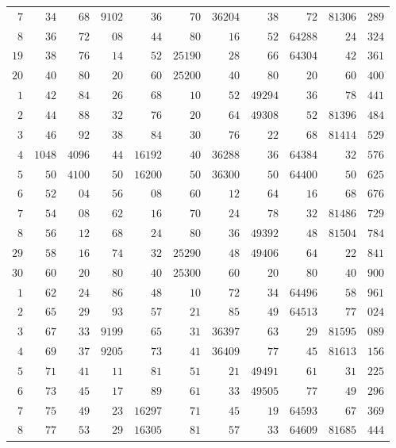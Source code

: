 \begin{longtable}{@{}r|r|r|r|r|r|r|r|r|r|r@{}}
$7$ & $34$ & $68$ & $9102$ & $36$ & $70$ & $36204$ & $38$ & $72$ & $81306$ & $289$\\
$8$ & $36$ & $72$ & $08$ & $44$ & $80$ & $16$ & $52$ & $64288$ & $24$ & $324$\\
$19$ & $38$ & $76$ & $14$ & $52$ & $25190$ & $28$ & $66$ & $64304$ & $42$ & $361$\\
$20$ & $40$ & $80$ & $20$ & $60$ & $25200$ & $40$ & $80$ & $20$ & $60$ & $400$\\
$1$ & $42$ & $84$ & $26$ & $68$ & $10$ & $52$ & $49294$ & $36$ & $78$ & $441$\\
$2$ & $44$ & $88$ & $32$ & $76$ & $20$ & $64$ & $49308$ & $52$ & $81396$ & $484$\\
$3$ & $46$ & $92$ & $38$ & $84$ & $30$ & $76$ & $22$ & $68$ & $81414$ & $529$\\
$4$ & $1048$ & $4096$ & $44$ & $16192$ & $40$ & $36288$ & $36$ & $64384$ & $32$ & $576$\\
$5$ & $50$ & $4100$ & $50$ & $16200$ & $50$ & $36300$ & $50$ & $64400$ & $50$ & $625$\\
$6$ & $52$ & $04$ & $56$ & $08$ & $60$ & $12$ & $64$ & $16$ & $68$ & $676$\\
$7$ & $54$ & $08$ & $62$ & $16$ & $70$ & $24$ & $78$ & $32$ & $81486$ & $729$\\
$8$ & $56$ & $12$ & $68$ & $24$ & $80$ & $36$ & $49392$ & $48$ & $81504$ & $784$\\
$29$ & $58$ & $16$ & $74$ & $32$ & $25290$ & $48$ & $49406$ & $64$ & $22$ & $841$\\
$30$ & $60$ & $20$ & $80$ & $40$ & $25300$ & $60$ & $20$ & $80$ & $40$ & $900$\\
$1$ & $62$ & $24$ & $86$ & $48$ & $10$ & $72$ & $34$ & $64496$ & $58$ & $961$\\
$2$ & $65$ & $29$ & $93$ & $57$ & $21$ & $85$ & $49$ & $64513$ & $77$ & $024$\\
$3$ & $67$ & $33$ & $9199$ & $65$ & $31$ & $36397$ & $63$ & $29$ & $81595$ & $089$\\
$4$ & $69$ & $37$ & $9205$ & $73$ & $41$ & $36409$ & $77$ & $45$ & $81613$ & $156$\\
$5$ & $71$ & $41$ & $11$ & $81$ & $51$ & $21$ & $49491$ & $61$ & $31$ & $225$\\
$6$ & $73$ & $45$ & $17$ & $89$ & $61$ & $33$ & $49505$ & $77$ & $49$ & $296$\\
$7$ & $75$ & $49$ & $23$ & $16297$ & $71$ & $45$ & $19$ & $64593$ & $67$ & $369$\\
$8$ & $77$ & $53$ & $29$ & $16305$ & $81$ & $57$ & $33$ & $64609$ & $81685$ & $444$\\

\end{longtable}
